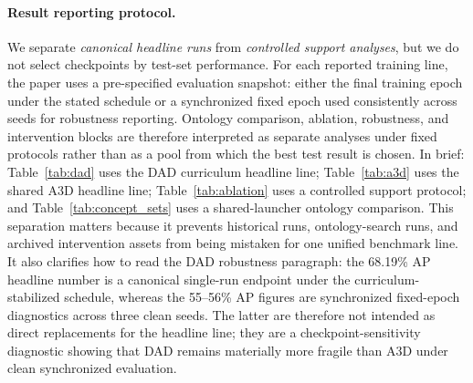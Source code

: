 \paragraph{Result reporting protocol.}
We separate \emph{canonical headline runs} from \emph{controlled support analyses},
but we do not select checkpoints by test-set performance. For each reported
training line, the paper uses a pre-specified evaluation snapshot: either the
final training epoch under the stated schedule or a synchronized fixed epoch
used consistently across seeds for robustness reporting. Ontology comparison,
ablation, robustness, and intervention blocks are therefore interpreted as
separate analyses under fixed protocols rather than as a pool from which the
best test result is chosen. In brief: Table~\ref{tab:dad} uses the DAD
curriculum headline line; Table~\ref{tab:a3d} uses the shared A3D headline
line; Table~\ref{tab:ablation} uses a controlled support protocol; and
Table~\ref{tab:concept_sets} uses a shared-launcher ontology comparison.
This separation matters because it prevents historical runs, ontology-search
runs, and archived intervention assets from being mistaken for one unified
benchmark line. It also clarifies how to read the DAD robustness paragraph:
the 68.19\% AP headline number is a canonical single-run endpoint under the
curriculum-stabilized schedule, whereas the 55--56\% AP figures are
synchronized fixed-epoch diagnostics across three clean seeds. The latter are
therefore not intended as direct replacements for the headline line; they are a
checkpoint-sensitivity diagnostic showing that DAD remains materially more
fragile than A3D under clean synchronized evaluation.

